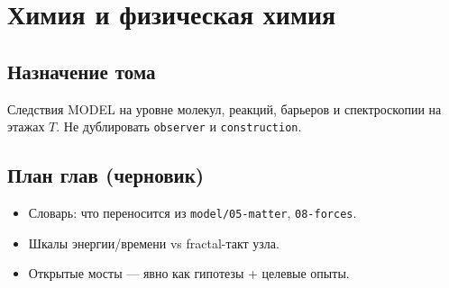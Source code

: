 \part{Химия и физическая химия}

\chapter{Назначение тома}
Следствия MODEL на уровне молекул, реакций, барьеров и спектроскопии
на этажах $T$. Не дублировать \texttt{observer} и \texttt{construction}.

\chapter{План глав (черновик)}
\begin{itemize}
  \item Словарь: что переносится из \texttt{model/05-matter}, \texttt{08-forces}.
  \item Шкалы энергии/времени vs fractal-такт узла.
  \item Открытые мосты --- явно как гипотезы + целевые опыты.
\end{itemize}




